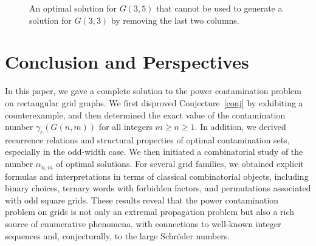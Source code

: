 \documentclass[letterpaper,12pt]{article}
\begin{document}
\begin{figure}[H]
\caption{An optimal solution for $G(3,5)$ that cannot be used to generate a solution for $G(3,3)$ by removing the last two columns.}
    \label{fig:solution_for_n3_m5}
\end{figure}





 














\section{Conclusion and Perspectives}\label{sec:conclusion}

 

In this paper, we gave a complete solution to the power contamination problem on rectangular grid graphs. We first disproved Conjecture~\ref{conj}   by exhibiting a counterexample, and then determined the exact value of the contamination number \(\gamma_c(G(n,m))\) for all integers \(m \ge n \ge 1\). In addition, we derived recurrence relations and structural properties of optimal contamination sets, especially in the odd-width case. We then initiated a combinatorial study of the number \(\alpha_{n,m}\) of optimal solutions. For several grid families, we obtained explicit formulas and interpretations in terms of classical combinatorial objects, including binary choices, ternary words with forbidden factors, and permutations associated with odd square grids. These results reveal that the power contamination problem on grids is not only an extremal propagation problem but also a rich source of enumerative phenomena, with connections to well-known integer sequences and, conjecturally, to the large Schr\"oder numbers.
\end{document}
